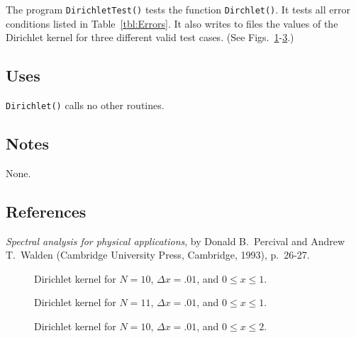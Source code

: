 \documentclass{article}
\begin{document}

The program {\tt DirichletTest()} tests the function {\tt Dirchlet()}.
It tests all error conditions listed in Table~\ref{tbl:Errors}.
It also writes to files the values of the Dirichlet kernel for three
different valid test cases.
(See Figs.~\ref{f:fig1}-\ref{f:fig3}.)

\subsection{Uses}


{\tt Dirichlet()\/} calls no other routines.

\subsection{Notes}

None.

\subsection{References}


\begin{thebibliography}{0}
{\em Spectral analysis for physical applications},
by Donald B.\ Percival and Andrew T.\ Walden
(Cambridge University Press, Cambridge, 1993), p.\ 26-27.
\end{thebibliography}


\begin{figure}[htb!]
\begin{center}
{}
\caption{\label{f:fig1}
Dirichlet kernel for $N=10$, $\Delta x =.01$, and $0\le x\le 1$.}
\end{center}
\end{figure}
%
\begin{figure}[htb!]
\begin{center}
{}
\caption{\label{f:fig2}
Dirichlet kernel for $N=11$, $\Delta x =.01$, and $0\le x\le 1$.}
\end{center}
\end{figure}
%
\begin{figure}[htb!]
\begin{center}
{}
\caption{\label{f:fig3}
Dirichlet kernel for $N=10$, $\Delta x =.01$, and $0\le x\le 2$.}
\end{center}
\end{figure}
%
\end{document}
